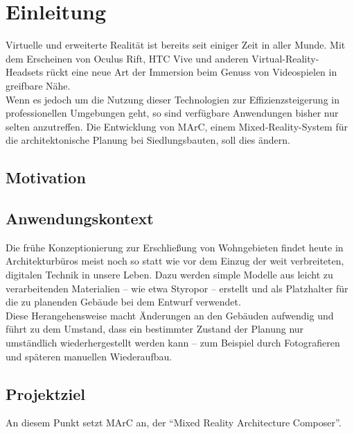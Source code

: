 \section{Einleitung}
Virtuelle und erweiterte Realität ist bereits seit einiger Zeit in aller Munde. Mit dem Erscheinen von Oculus Rift, HTC Vive und anderen Virtual-Reality-Headsets rückt eine neue Art der Immersion beim Genuss von Videospielen in greifbare Nähe.\\
Wenn es jedoch um die Nutzung dieser Technologien zur Effizienzsteigerung in professionellen Umgebungen geht, so sind verfügbare Anwendungen bisher nur selten anzutreffen.
Die Entwicklung von MArC, einem Mixed-Reality-System für die architektonische Planung bei Siedlungsbauten, soll dies ändern.

\subsection{Motivation}

\subsection{Anwendungskontext} 
Die frühe Konzeptionierung zur Erschließung von Wohngebieten findet heute in Architekturbüros meist noch so statt wie vor dem Einzug der weit verbreiteten, digitalen Technik in unsere Leben. Dazu werden simple Modelle aus leicht zu verarbeitenden Materialien -- wie etwa Styropor -- erstellt und als Platzhalter für die zu planenden Gebäude bei dem Entwurf verwendet.\\
Diese Herangehensweise macht Änderungen an den Gebäuden aufwendig und führt zu dem Umstand, dass ein bestimmter Zustand der Planung nur umständlich wiederhergestellt werden kann -- zum Beispiel durch Fotografieren und späteren manuellen Wiederaufbau.

\subsection{Projektziel}
An diesem Punkt setzt MArC an, der "`Mixed Reality Architecture Composer"'. 
